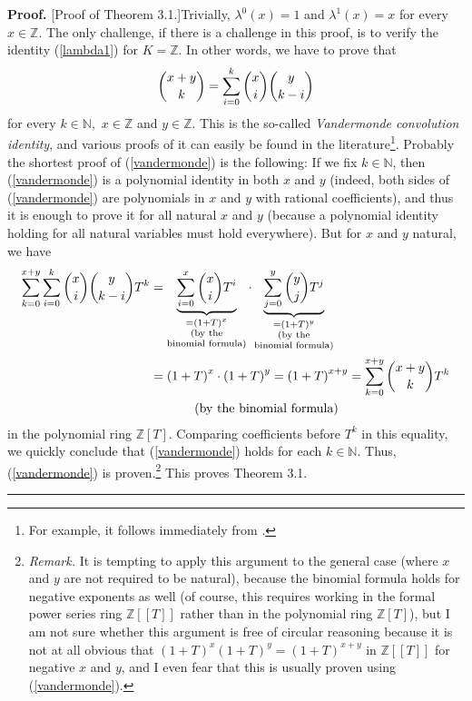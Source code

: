\documentclass[numbers=enddot,12pt,final,onecolumn,notitlepage]{scrartcl}%
\newenvironment{proof}[1][Proof]{\noindent\textbf{#1.} }{\ \rule{0.5em}{0.5em}}
\begin{document}
\begin{proof}
[Proof of Theorem 3.1.]Trivially, $\lambda^{0}\left(  x\right)  =1$ and
$\lambda^{1}\left(  x\right)  =x$ for every $x\in\mathbb{Z}$. The only
challenge, if there is a challenge in this proof, is to verify the identity
(\ref{lambda1}) for $K=\mathbb{Z}$. In other words, we have to prove that%
\begin{equation}
\dbinom{x+y}{k}=\sum_{i=0}^{k}\dbinom{x}{i}\dbinom{y}{k-i} \label{vandermonde}%
\end{equation}
for every $k\in\mathbb{N},$ $x\in\mathbb{Z}$ and $y\in\mathbb{Z}.$ This is the
so-called \textit{Vandermonde convolution identity}, and various proofs of it
can easily be found in the literature\footnote{For example, it follows
immediately from \cite[Theorem 3.3]{Grin-detn}.}. Probably the shortest proof
of (\ref{vandermonde}) is the following: If we fix $k\in\mathbb{N}$, then
(\ref{vandermonde}) is a polynomial identity in both $x$ and $y$ (indeed, both
sides of (\ref{vandermonde}) are polynomials in $x$ and $y$ with rational
coefficients), and thus it is enough to prove it for all natural $x$ and $y$
(because a polynomial identity holding for all natural variables must hold
everywhere). But for $x$ and $y$ natural, we have%
\begin{align*}
\sum_{k=0}^{x+y}\sum_{i=0}^{k}\dbinom{x}{i}\dbinom{y}{k-i}T^{k}  &
=\underbrace{\sum_{i=0}^{x}\dbinom{x}{i}T^{i}}_{\substack{=\left(  1+T\right)
^{x}\\\text{(by the}\\\text{binomial formula)}}}\cdot\underbrace{\sum
_{j=0}^{y}\dbinom{y}{j}T^{j}}_{\substack{=\left(  1+T\right)  ^{y}\\\text{(by
the}\\\text{binomial formula)}}}\\
&  =\left(  1+T\right)  ^{x}\cdot\left(  1+T\right)  ^{y}=\left(  1+T\right)
^{x+y}=\sum_{k=0}^{x+y}\dbinom{x+y}{k}T^{k}\\
&  \ \ \ \ \ \ \ \ \ \ \left(  \text{by the binomial formula}\right)
\end{align*}
in the polynomial ring $\mathbb{Z}\left[  T\right]  $. Comparing coefficients
before $T^{k}$ in this equality, we quickly conclude that (\ref{vandermonde})
holds for each $k\in\mathbb{N}$. Thus, (\ref{vandermonde}) is
proven.\footnote{\textit{Remark.} It is tempting to apply this argument to the
general case (where $x$ and $y$ are not required to be natural), because the
binomial formula holds for negative exponents as well (of course, this
requires working in the formal power series ring $\mathbb{Z}\left[  \left[
T\right]  \right]  $ rather than in the polynomial ring $\mathbb{Z}\left[
T\right]  $), but I am not sure whether this argument is free of circular
reasoning because it is not at all obvious that $\left(  1+T\right)
^{x}\left(  1+T\right)  ^{y}=\left(  1+T\right)  ^{x+y}$ in $\mathbb{Z}\left[
\left[  T\right]  \right]  $ for negative $x$ and $y$, and I even fear that
this is usually proven using (\ref{vandermonde}).} This proves Theorem 3.1.
\end{proof}
\end{document}
